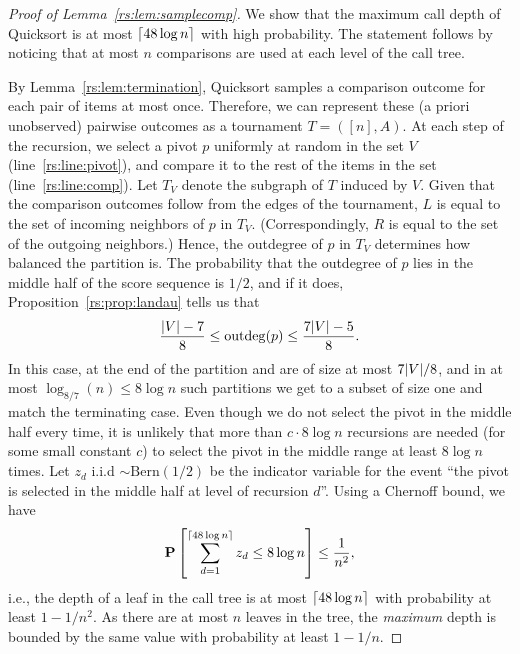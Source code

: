 \begin{proof}[Proof of Lemma~\ref{rs:lem:samplecomp}]
We show that the maximum call depth of Quicksort is at most $\lceil48 \log n\rceil$ with high probability.
The statement follows by noticing that at most $n$ comparisons are used at each level of the call tree.

By Lemma~\ref{rs:lem:termination}, Quicksort samples a comparison outcome for each pair of items at most once.
Therefore, we can represent these (a priori unobserved) pairwise outcomes as a tournament $T = ([n], A)$.
At each step of the recursion, we select a pivot $p$ uniformly at random in the set $V$ (line~\ref{rs:line:pivot}), and compare it to the rest of the items in the set (line~\ref{rs:line:comp}).
Let $T_V$ denote the subgraph of $T$ induced by $V$.
Given that the comparison outcomes follow from the edges of the tournament, $L$ is equal to the set of incoming neighbors of $p$ in $T_V$.
(Correspondingly, $R$ is equal to the set of the outgoing neighbors.)
Hence, the outdegree of $p$ in $T_V$ determines how balanced the partition is.
The probability that the outdegree of $p$ lies in the middle half of the score sequence is $1/2$, and if it does, Proposition~\ref{rs:prop:landau} tells us that
\begin{align*}
\frac{\lvert V \rvert - 7}{8} \le \mathrm{outdeg}(p) \le \frac{7 \lvert V \rvert - 5}{8}.
\end{align*}
In this case, at the end of the partition  and  are of size at most $7\lvert V \rvert/8$, and in at most $\log_{8/7}(n) \le 8 \log n $ such partitions we get to a subset of size one and match the terminating case.
Even though we do not select the pivot in the middle half every time, it is unlikely that more than $c \cdot 8 \log n$ recursions are needed (for some small constant $c$) to select the pivot in the middle range at least $8 \log n$ times.
Let $z_d$ i.i.d $\sim \text{Bern}(1/2)$ be the indicator variable for the event ``the pivot is selected in the middle half at level of recursion $d$''.
Using a Chernoff bound, we have
\begin{align*}
\mathbf{P}\left[ \sum_{d=1}^{\lceil48 \log n\rceil} z_d \le 8 \log n \right] \le \frac{1}{n^2},
\end{align*}
i.e., the depth of a leaf in the call tree is at most $\lceil48 \log n\rceil$ with probability at least $1 - 1/n^2$.
As there are at most $n$ leaves in the tree, the \emph{maximum} depth is bounded by the same value with probability at least $1 - 1/n$.
\end{proof}

